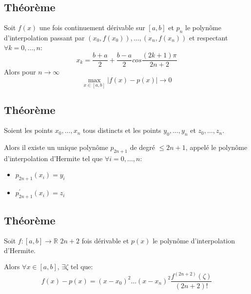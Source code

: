 \documentclass{article}
\newcommand{\R}{\mathbb{R}}
\begin{document}
\subsection{Théorème}
Soit $f(x)$ une fois continuement dérivable sur $[a,b]$ et $p_n$ le polynôme d'interpolation passant par $(x_0, f(x_0)), \dots, (x_n, f(x_n))$
et respectant $\forall k = 0, \dots, n$:
$$x_k = \frac{b + a}{2} + \frac{b - a}{2}cos\frac{(2k + 1)\pi}{2n + 2}$$
Alors pour $ n \rightarrow \infty$
$$\max_{x \in [a,b]}|f(x) - p(x)| \rightarrow 0$$

\subsection{Théorème}
Soient les points $x_0, \dots, x_n$ tous distincts et les points $y_0, \dots, y_n$ et $z_0, \dots, z_n$.

Alors il existe un unique polynôme $p_{2n + 1}$ de degré $\leq 2n + 1$, appelé le polynôme d'interpolation d'Hermite tel que $\forall i = 0, \dots, n$:
\begin{itemize}
    \item $p_{2n + 1}(x_i)  = y_i$
    \item $p_{2n + 1 }^{'}(x_i) = z_i$
\end{itemize}

\subsection{Théorème}
Soit $f: [a, b] \rightarrow \R$ $2n + 2$ fois dérivable et $p(x)$ le polynôme d'interpolation d'Hermite.

Alors $\forall x \in [a, b]$, $\exists \zeta $ tel que:
$$f(x) - p(x) = (x - x_0)^2\dots(x - x_n)^2 \frac{f^{(2n + 2)}(\zeta)}{(2n + 2)!}$$
\end{document}
